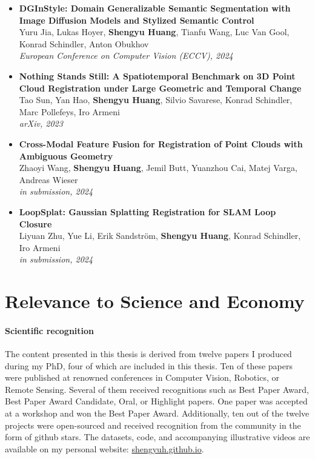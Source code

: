 \begin{itemize}
    \item \noindent\textbf{ DGInStyle: Domain Generalizable Semantic Segmentation with Image Diffusion Models and Stylized Semantic Control} \\[0.5em]
    Yuru Jia, Lukas Hoyer, \textbf{Shengyu Huang}, Tianfu Wang, Luc Van Gool, Konrad Schindler, Anton Obukhov \\
    \textit{European Conference on Computer Vision (ECCV), 2024}
    
    \item \noindent\textbf{ Nothing Stands Still: A Spatiotemporal Benchmark on 3D Point Cloud Registration under Large Geometric and Temporal Change} \\[0.5em]
    Tao Sun, Yan Hao, \textbf{Shengyu Huang}, Silvio Savarese, Konrad Schindler, Marc Pollefeys, Iro Armeni \\
    \textit{arXiv, 2023}
    
    \item \noindent\textbf{ Cross-Modal Feature Fusion for Registration of Point Clouds with Ambiguous Geometry} \\[0.5em]
    Zhaoyi Wang, \textbf{Shengyu Huang}, Jemil Butt, Yuanzhou Cai, Matej Varga, Andreas Wieser \\
    \textit{in submission, 2024}

    \item \noindent\textbf{ LoopSplat: Gaussian Splatting Registration for SLAM Loop Closure} \\[0.5em]
    Liyuan Zhu, Yue Li, Erik Sandström, \textbf{Shengyu Huang}, Konrad Schindler, Iro Armeni \\
    \textit{in submission, 2024}

\end{itemize}




\section{Relevance to Science and Economy}
\paragraph{Scientific recognition}
The content presented in this thesis is derived from twelve papers I produced during my PhD, four of which are included in this thesis. Ten of these papers were published at renowned conferences in Computer Vision, Robotics, or Remote Sensing. Several of them received recognitions such as Best Paper Award, Best Paper Award Candidate, Oral, or Highlight papers. One paper was accepted at a workshop and won the Best Paper Award. Additionally, ten out of the twelve projects were open-sourced and received recognition from the community in the form of github stars. The datasets, code, and accompanying illustrative videos are available on my personal website: \url{shengyuh.github.io}.

